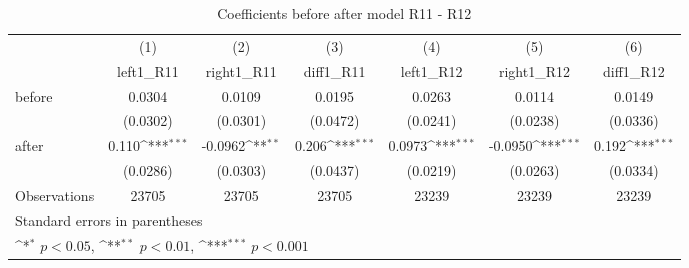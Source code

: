 \begin{table}[!ht]\centering \footnotesize
\def\sym#1{\ifmmode^{#1}\else\(^{#1}\)\fi}
\caption{Coefficients before after model R11 - R12}
\begin{tabular}{l*{6}{c}}
\hline\hline
                    &\multicolumn{1}{c}{(1)}&\multicolumn{1}{c}{(2)}&\multicolumn{1}{c}{(3)}&\multicolumn{1}{c}{(4)}&\multicolumn{1}{c}{(5)}&\multicolumn{1}{c}{(6)}\\
                    &\multicolumn{1}{c}{left1\_R11}&\multicolumn{1}{c}{right1\_R11}&\multicolumn{1}{c}{diff1\_R11}&\multicolumn{1}{c}{left1\_R12}&\multicolumn{1}{c}{right1\_R12}&\multicolumn{1}{c}{diff1\_R12}\\
\hline
before              &      0.0304         &      0.0109         &      0.0195         &      0.0263         &      0.0114         &      0.0149         \\
                    &    (0.0302)         &    (0.0301)         &    (0.0472)         &    (0.0241)         &    (0.0238)         &    (0.0336)         \\
[1em]
after               &       0.110\sym{***}&     -0.0962\sym{**} &       0.206\sym{***}&      0.0973\sym{***}&     -0.0950\sym{***}&       0.192\sym{***}\\
                    &    (0.0286)         &    (0.0303)         &    (0.0437)         &    (0.0219)         &    (0.0263)         &    (0.0334)         \\
\hline
Observations        &       23705         &       23705         &       23705         &       23239         &       23239         &       23239         \\
\hline\hline
\multicolumn{7}{l}{\footnotesize Standard errors in parentheses}\\
\multicolumn{7}{l}{\footnotesize \sym{*} \(p<0.05\), \sym{**} \(p<0.01\), \sym{***} \(p<0.001\)}\\
\end{tabular}
\end{table}

